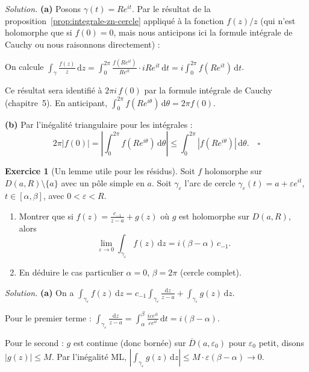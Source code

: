 \documentclass[12pt,a4paper,openany]{book}
\theoremstyle{definition}
\newtheorem{exercice}{Exercice}[chapter]
\theoremstyle{plain}
\theoremstyle{remark}
\newcommand{\dd}{\mathrm{d}}
\newcommand{\abs}[1]{\left|#1\right|}
\begin{document}
\noindent\textit{Solution.}\enspace
\textbf{(a)} Posons $\gamma(t) = Re^{it}$. Par le résultat de la
proposition~\ref{prop:integrale-zn-cercle} appliqué à la fonction
$f(z)/z$ (qui n'est holomorphe que si $f(0) = 0$, mais nous anticipons ici la
formule intégrale de Cauchy ou nous raisonnons directement) :

On calcule $\int_\gamma \frac{f(z)}{z}\,\dd z = \int_0^{2\pi}
\frac{f(Re^{it})}{Re^{it}}\cdot iRe^{it}\,\dd t = i\int_0^{2\pi}
f(Re^{it})\,\dd t$.

Ce résultat sera identifié à $2\pi i\,f(0)$ par la formule intégrale de
Cauchy (chapitre~5). En anticipant, $\int_0^{2\pi}f(Re^{i\theta})\,\dd\theta
= 2\pi f(0)$.

\textbf{(b)} Par l'inégalité triangulaire pour les intégrales :
\[
  2\pi\abs{f(0)} = \abs{\int_0^{2\pi}f(Re^{i\theta})\,\dd\theta}
  \leq \int_0^{2\pi}\abs{f(Re^{i\theta})}\,\dd\theta. \quad\square
\]

\bigskip

\begin{exercice}[Un lemme utile pour les résidus]\label{exo:lemme-residus}
Soit $f$ holomorphe sur $D(a, R) \setminus \{a\}$ avec un pôle simple en $a$.
Soit $\gamma_\varepsilon$ l'arc de cercle $\gamma_\varepsilon(t) = a +
\varepsilon e^{it}$, $t \in [\alpha, \beta]$, avec $0 < \varepsilon < R$.
\begin{enumerate}[label=\textup{(\alph*)}]
  \item Montrer que si $f(z) = \frac{c_{-1}}{z-a} + g(z)$ où $g$ est holomorphe
    sur $D(a,R)$, alors
    \[
      \lim_{\varepsilon \to 0} \int_{\gamma_\varepsilon} f(z)\,\dd z
      = i(\beta - \alpha)\,c_{-1}.
    \]
  \item En déduire le cas particulier $\alpha = 0$, $\beta = 2\pi$
    (cercle complet).
\end{enumerate}
\end{exercice}

\noindent\textit{Solution.}\enspace
\textbf{(a)} On a $\int_{\gamma_\varepsilon} f(z)\,\dd z =
c_{-1}\int_{\gamma_\varepsilon}\frac{\dd z}{z-a} +
\int_{\gamma_\varepsilon}g(z)\,\dd z$.

Pour le premier terme : $\int_{\gamma_\varepsilon}\frac{\dd z}{z-a} =
\int_\alpha^\beta \frac{i\varepsilon e^{it}}{\varepsilon e^{it}}\,\dd t =
i(\beta-\alpha)$.

Pour le second : $g$ est continue (donc bornée) sur $\overline{D}(a,
\varepsilon_0)$ pour $\varepsilon_0$ petit, disons $\abs{g(z)} \leq M$.
Par l'inégalité ML, $\abs{\int_{\gamma_\varepsilon}g(z)\,\dd z} \leq
M \cdot \varepsilon(\beta-\alpha) \to 0$.
\end{document}
